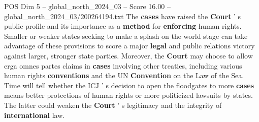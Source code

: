 \begin{textsample}{POS Dim 5 – global\_north\_2024\_03 – Score 16.00 – global\_north\_2024\_03/200264194.txt}
The \textbf{cases} have raised the \textbf{Court} ' s public profile and its importance as a \textbf{method} for \textbf{enforcing} human rights.
Smaller or weaker states seeking to make a splash on the world stage can take advantage of these provisions to score a major \textbf{legal} and public relations victory against larger, stronger state parties.
Moreover, the \textbf{Court} may choose to allow erga omnes partes claims in \textbf{cases} involving other treaties, including various human rights \textbf{conventions} and the UN \textbf{Convention} on the Law of the Sea.
Time will tell whether the ICJ ' s decision to open the floodgates to more \textbf{cases} means better protections of human rights or more politicized lawsuits by states.
The latter could weaken the \textbf{Court} ' s legitimacy and the integrity of \textbf{international} law.

\end{textsample}
